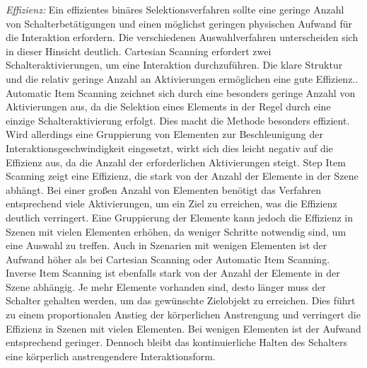 \textit{Effizienz:}
Ein effizientes binäres Selektionsverfahren sollte eine geringe Anzahl von Schalterbetätigungen und einen möglichst geringen physischen Aufwand für die Interaktion erfordern. Die verschiedenen Auswahlverfahren unterscheiden sich in dieser Hinsicht deutlich. Cartesian Scanning erfordert zwei Schalteraktivierungen, um eine Interaktion durchzuführen. Die klare Struktur und die relativ geringe Anzahl an Aktivierungen ermöglichen eine gute Effizienz.. Automatic Item Scanning zeichnet sich durch eine besonders geringe Anzahl von Aktivierungen aus, da die Selektion eines Elements in der Regel durch eine einzige Schalteraktivierung erfolgt. Dies macht die Methode besonders effizient. Wird allerdings eine Gruppierung von Elementen zur Beschleunigung der Interaktionsgeschwindigkeit eingesetzt, wirkt sich dies leicht negativ auf die Effizienz aus, da die Anzahl der erforderlichen Aktivierungen steigt. Step Item Scanning zeigt eine Effizienz, die stark von der Anzahl der Elemente in der Szene abhängt. Bei einer großen Anzahl von Elementen benötigt das Verfahren entsprechend viele Aktivierungen, um ein Ziel zu erreichen, was die Effizienz deutlich verringert. Eine Gruppierung der Elemente kann jedoch die Effizienz in Szenen mit vielen Elementen erhöhen, da weniger Schritte notwendig sind, um eine Auswahl zu treffen. Auch in Szenarien mit wenigen Elementen ist der Aufwand höher als bei Cartesian Scanning oder Automatic Item Scanning. Inverse Item Scanning ist ebenfalls stark von der Anzahl der Elemente in der Szene abhängig. Je mehr Elemente vorhanden sind, desto länger muss der Schalter gehalten werden, um das gewünschte Zielobjekt zu erreichen. Dies führt zu einem proportionalen Anstieg der körperlichen Anstrengung und verringert die Effizienz in Szenen mit vielen Elementen. Bei wenigen Elementen ist der Aufwand entsprechend geringer. Dennoch bleibt das kontinuierliche Halten des Schalters eine körperlich anstrengendere Interaktionsform. 

